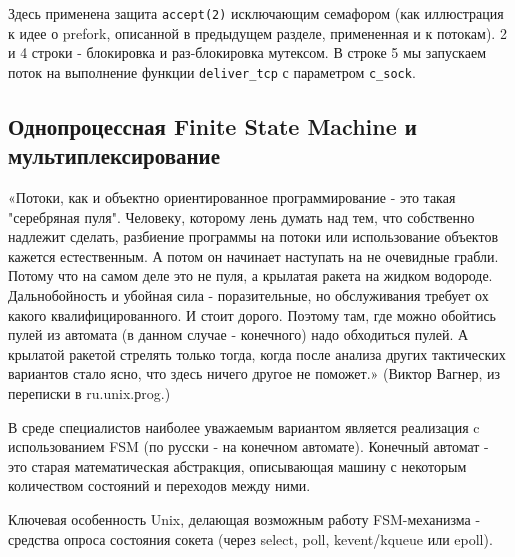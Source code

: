 Здесь применена защита \verb+accept(2)+ исключающим семафором (как иллюстрация к идее о prefork, описанной в предыдущем разделе, примененная и к потокам). 2 и 4 строки - блокировка и раз-блокировка мутексом. В строке 5 мы запускаем поток на выполнение функции \verb+deliver_tcp+ с параметром \verb+c_sock+.

\subsection{Однопроцессная Finite State Machine и мультиплексирование}

«Потоки, как и объектно ориентированное программирование - это такая "серебряная пуля". Человеку, которому лень думать над тем, что собственно надлежит сделать, разбиение программы на потоки или использование объектов кажется естественным.
А потом он начинает наступать на не очевидные грабли. Потому что на самом деле это не пуля, а крылатая ракета на жидком водороде. Дальнобойность и убойная сила - поразительные, но обслуживания требует ох какого квалифицированного. И стоит дорого.
Поэтому там, где можно обойтись пулей из автомата (в данном случае - конечного) надо обходиться пулей. А крылатой ракетой стрелять только тогда, когда после анализа других тактических вариантов стало ясно, что здесь ничего другое не поможет.» (Виктор Вагнер, из переписки в ru.unix.рrog.)

В среде специалистов наиболее уважаемым вариантом является реализация c использованием FSM (по русски - на конечном автомате). Конечный автомат - это старая математическая абстракция, описывающая машину с некоторым количеством состояний и переходов между ними.

Ключевая особенность Unix, делающая возможным работу FSM-механизма - средства опроса состояния сокета (через select, poll, kevent/kqueue или epoll).

